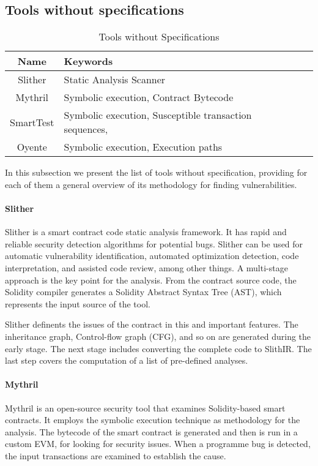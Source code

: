 \documentclass[a4paper,sigconf, language=french,
language=german, language=spanish, language=english]{acmart}
\begin{document}
\subsection{Tools without specifications}
\begin{table*}
  \caption{Tools without Specifications}
  \label{tab:ToolsWithoutSpec}
  \begin{tabular}{cll}
  \toprule
    Name & Keywords\\
    \midrule
    Slither & Static Analysis Scanner\\
    Mythril & Symbolic execution, Contract Bytecode \\
    SmartTest & Symbolic execution, Susceptible transaction sequences,\\
    Oyente  & Symbolic execution, Execution paths \\
    \bottomrule
 \end{tabular}
\end{table*}

In this subsection we present the list of tools without specification, providing for each of them a general overview of its methodology for finding vulnerabilities.

\paragraph{Slither} 
Slither is a smart contract code static analysis framework.
It has rapid and reliable security detection algorithms for potential bugs.
Slither can be used for automatic vulnerability identification, automated optimization detection, code interpretation, and assisted code review, among other things.
A multi-stage approach is the key point for the analysis.
From the contract source code, the Solidity compiler generates a Solidity Abstract Syntax Tree (AST), which represents the input source of the tool.

Slither definents the issues of the contract in this and important features. The inheritance graph, Control-flow graph (CFG), and so on are generated during the early stage.
The next stage includes converting the complete code to SlithIR.
The last step covers the computation of a list of pre-defined analyses. 

\paragraph{Mythril} 
Mythril is an open-source security tool that examines Solidity-based smart contracts.
It employs the symbolic execution technique as methodology for the analysis.
The bytecode of the smart contract is generated and then is run in a custom EVM, for looking for security issues.
When a programme bug is detected, the input transactions are examined to establish the cause. 
\end{document}
